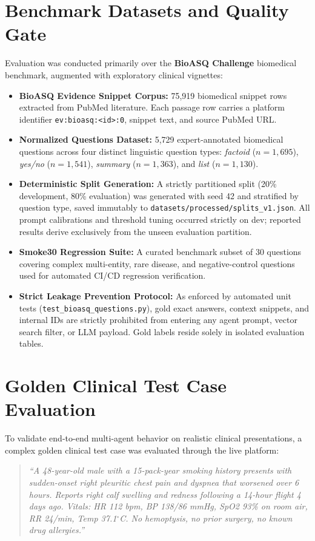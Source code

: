 \documentclass[12pt,a4paper]{report}
\begin{document}
\section{Benchmark Datasets and Quality Gate}
Evaluation was conducted primarily over the \textbf{BioASQ Challenge} biomedical benchmark, augmented with exploratory clinical vignettes:
\begin{itemize}
    \item \textbf{BioASQ Evidence Snippet Corpus:} 75,919 biomedical snippet rows extracted from PubMed literature. Each passage row carries a platform identifier \texttt{ev:bioasq:<id>:0}, snippet text, and source PubMed URL.
    \item \textbf{Normalized Questions Dataset:} 5,729 expert-annotated biomedical questions across four distinct linguistic question types: \textit{factoid} ($n=1,695$), \textit{yes/no} ($n=1,541$), \textit{summary} ($n=1,363$), and \textit{list} ($n=1,130$).
    \item \textbf{Deterministic Split Generation:} A strictly partitioned split (20\% development, 80\% evaluation) was generated with seed 42 and stratified by question type, saved immutably to \texttt{datasets/processed/splits\_v1.json}. All prompt calibrations and threshold tuning occurred strictly on dev; reported results derive exclusively from the unseen evaluation partition.
    \item \textbf{Smoke30 Regression Suite:} A curated benchmark subset of 30 questions covering complex multi-entity, rare disease, and negative-control questions used for automated CI/CD regression verification.
    \item \textbf{Strict Leakage Prevention Protocol:} As enforced by automated unit tests (\texttt{test\_bioasq\_questions.py}), gold exact answers, context snippets, and internal IDs are strictly prohibited from entering any agent prompt, vector search filter, or LLM payload. Gold labels reside solely in isolated evaluation tables.
\end{itemize}

\section{Golden Clinical Test Case Evaluation}
To validate end-to-end multi-agent behavior on realistic clinical presentations, a complex golden clinical test case was evaluated through the live platform:
\begin{quote}
\textit{``A 48-year-old male with a 15-pack-year smoking history presents with sudden-onset right pleuritic chest pain and dyspnea that worsened over 6 hours. Reports right calf swelling and redness following a 14-hour flight 4 days ago. Vitals: HR 112 bpm, BP 138/86 mmHg, SpO2 93\% on room air, RR 24/min, Temp 37.1$^\circ$C. No hemoptysis, no prior surgery, no known drug allergies.''}
\end{quote}
\end{document}
